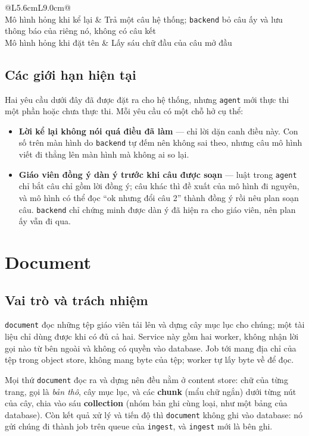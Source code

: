 \begin{longtable}{@{}L{5.6cm}L{9.0cm}@{}}
 \\
\addlinespace
Mô hình hỏng khi kể lại & Trả một câu hệ thống; \texttt{backend} bỏ câu ấy và lưu thông báo của riêng nó, không có câu kết \\
Mô hình hỏng khi đặt tên & Lấy sáu chữ đầu của câu mở đầu \\
\end{longtable}

\subsection{Các giới hạn hiện tại}
\label{sec:agent-gioi-han}

Hai yêu cầu dưới đây đã được đặt ra cho hệ thống, nhưng \texttt{agent} mới thực thi một phần hoặc
chưa thực thi. Mỗi yêu cầu có một chỗ hở cụ thể:

\begin{itemize}
  \item \textbf{Lời kể lại không nói quá điều đã làm} --- chỉ lời dặn canh điều này. Con số trên màn
        hình do \texttt{backend} tự đếm nên không sai theo, nhưng câu mô hình viết đi thẳng lên màn
        hình mà không ai so lại.
  \item \textbf{Giáo viên đồng ý dàn ý trước khi câu được soạn} --- luật trong \texttt{agent} chỉ
        bắt câu chỉ gồm lời đồng ý; câu khác thì đề xuất của mô hình đi nguyên, và mô hình có thể
        đọc ``ok nhưng đổi câu 2'' thành đồng ý rồi nêu plan soạn câu. \texttt{backend} chỉ chứng
        minh được dàn ý đã hiện ra cho giáo viên, nên plan ấy vẫn đi qua.
\end{itemize}

\section{Document}

\subsection{Vai trò và trách nhiệm}

\texttt{document} đọc những tệp giáo viên tải lên và dựng cây mục lục cho chúng; một tài liệu chỉ
dùng được khi có đủ cả hai. Service này gồm hai worker, không nhận lời gọi nào từ bên ngoài và không
có quyền vào database. Job tới mang địa chỉ của tệp trong object store, không mang byte của tệp;
worker tự lấy byte về để đọc.

Mọi thứ \texttt{document} đọc ra và dựng nên đều nằm ở content store: chữ của từng trang, gọi là
\emph{bản thô}, cây mục lục, và các \textbf{chunk} (mẩu chữ ngắn) dưới từng nút của cây, chia vào
sáu \textbf{collection} (nhóm bản ghi cùng loại, như một bảng của database). Còn kết quả xử lý và
tiến độ thì \texttt{document} không ghi vào database: nó gửi chúng đi thành job trên queue của
\texttt{ingest}, và \texttt{ingest} mới là bên ghi.

